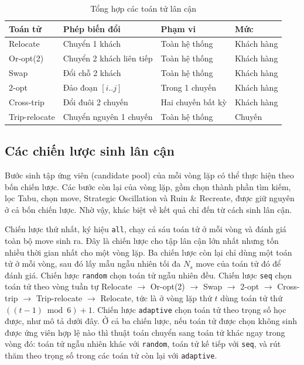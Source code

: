 \documentclass[../DoAn.tex]{subfiles}
\begin{document}
\begin{table}[H]
\centering
\caption{Tổng hợp các toán tử lân cận}
\label{tab:operators}
\begin{tabular}{llll}
\toprule
\textbf{Toán tử} & \textbf{Phép biến đổi} & \textbf{Phạm vi} & \textbf{Mức} \\
\midrule
Relocate         & Chuyển 1 khách                 & Toàn hệ thống   & Khách hàng \\
Or-opt(2)        & Chuyển 2 khách liên tiếp       & Toàn hệ thống   & Khách hàng \\
Swap             & Đổi chỗ 2 khách                & Toàn hệ thống   & Khách hàng \\
2-opt            & Đảo đoạn $[i..j]$              & Trong 1 chuyến  & Khách hàng \\
Cross-trip       & Đổi đuôi 2 chuyến              & Hai chuyến bất kỳ & Khách hàng \\
Trip-relocate    & Chuyển nguyên 1 chuyến         & Toàn hệ thống   & Chuyến \\
\bottomrule
\end{tabular}
\end{table}

\subsection{Các chiến lược sinh lân cận}
\label{subsec:modes}

Bước sinh tập ứng viên (candidate pool) của mỗi vòng lặp có thể thực hiện theo bốn chiến lược. Các bước còn lại của vòng lặp, gồm chọn thành phần tìm kiếm, lọc Tabu, chọn move, Strategic Oscillation và Ruin \& Recreate, được giữ nguyên ở cả bốn chiến lược. Nhờ vậy, khác biệt về kết quả chỉ đến từ cách sinh lân cận.

Chiến lược thứ nhất, ký hiệu \texttt{all}, chạy cả sáu toán tử ở mỗi vòng và đánh giá toàn bộ move sinh ra. Đây là chiến lược cho tập lân cận lớn nhất nhưng tốn nhiều thời gian nhất cho một vòng lặp. Ba chiến lược còn lại chỉ dùng một toán tử ở mỗi vòng, sau đó lấy mẫu ngẫu nhiên tối đa $N_s$ move của toán tử đó để đánh giá. Chiến lược \texttt{random} chọn toán tử ngẫu nhiên đều. Chiến lược \texttt{seq} chọn toán tử theo vòng tuần tự Relocate $\to$ Or-opt(2) $\to$ Swap $\to$ 2-opt $\to$ Cross-trip $\to$ Trip-relocate $\to$ Relocate, tức là ở vòng lặp thứ $t$ dùng toán tử thứ $((t-1) \bmod 6) + 1$. Chiến lược \texttt{adaptive} chọn toán tử theo trọng số học được, như mô tả dưới đây. Ở cả ba chiến lược, nếu toán tử được chọn không sinh được ứng viên hợp lệ nào thì thuật toán chuyển sang toán tử khác ngay trong vòng đó: toán tử ngẫu nhiên khác với \texttt{random}, toán tử kế tiếp với \texttt{seq}, và rút thăm theo trọng số trong các toán tử còn lại với \texttt{adaptive}.
\end{document}
